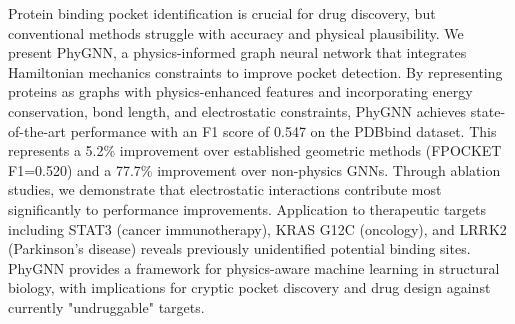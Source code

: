 Protein binding pocket identification is crucial for drug discovery, but conventional methods struggle with accuracy and physical plausibility. We present PhyGNN, a physics-informed graph neural network that integrates Hamiltonian mechanics constraints to improve pocket detection. By representing proteins as graphs with physics-enhanced features and incorporating energy conservation, bond length, and electrostatic constraints, PhyGNN achieves state-of-the-art performance with an F1 score of 0.547 on the PDBbind dataset. This represents a 5.2\% improvement over established geometric methods (FPOCKET F1=0.520) and a 77.7\% improvement over non-physics GNNs. Through ablation studies, we demonstrate that electrostatic interactions contribute most significantly to performance improvements. Application to therapeutic targets including STAT3 (cancer immunotherapy), KRAS G12C (oncology), and LRRK2 (Parkinson's disease) reveals previously unidentified potential binding sites. PhyGNN provides a framework for physics-aware machine learning in structural biology, with implications for cryptic pocket discovery and drug design against currently "undruggable" targets.
